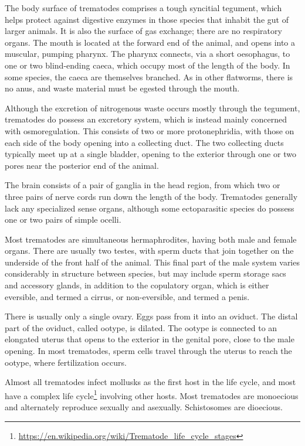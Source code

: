 \documentclass[]{book}
\let\rmarkdownfootnote\footnote%
\def\footnote{\protect\rmarkdownfootnote}
\renewcommand{\href}[2]{#2\footnote{\url{#1}}}
\begin{document}
The body surface of trematodes comprises a tough syncitial tegument, which helps protect against digestive enzymes in those species that inhabit the gut of larger animals. It is also the surface of gas exchange; there are no respiratory organs. The mouth is located at the forward end of the animal, and opens into a muscular, pumping pharynx. The pharynx connects, via a short oesophagus, to one or two blind-ending caeca, which occupy most of the length of the body. In some species, the caeca are themselves branched. As in other flatworms, there is no anus, and waste material must be egested through the mouth.

Although the excretion of nitrogenous waste occurs mostly through the tegument, trematodes do possess an excretory system, which is instead mainly concerned with osmoregulation. This consists of two or more protonephridia, with those on each side of the body opening into a collecting duct. The two collecting ducts typically meet up at a single bladder, opening to the exterior through one or two pores near the posterior end of the animal.

The brain consists of a pair of ganglia in the head region, from which two or three pairs of nerve cords run down the length of the body. Trematodes generally lack any specialized sense organs, although some ectoparasitic species do possess one or two pairs of simple ocelli.

Most trematodes are simultaneous hermaphrodites, having both male and female organs. There are usually two testes, with sperm ducts that join together on the underside of the front half of the animal. This final part of the male system varies considerably in structure between species, but may include sperm storage sacs and accessory glands, in addition to the copulatory organ, which is either eversible, and termed a cirrus, or non-eversible, and termed a penis.

There is usually only a single ovary. Eggs pass from it into an oviduct. The distal part of the oviduct, called ootype, is dilated. The ootype is connected to an elongated uterus that opens to the exterior in the genital pore, close to the male opening. In most trematodes, sperm cells travel through the uterus to reach the ootype, where fertilization occurs.

Almost all trematodes infect mollusks as the first host in the life cycle, and most have a \href{https://en.wikipedia.org/wiki/Trematode_life_cycle_stages}{complex life cycle} involving other hosts. Most trematodes are monoecious and alternately reproduce sexually and asexually. Schistosomes are dioecious.
\end{document}
